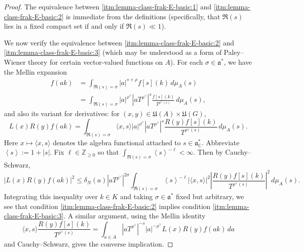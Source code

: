 \documentclass[reqno]{amsart}
\theoremstyle{plain} \newtheorem{theorem} {Theorem}
\theoremstyle{definition} \newtheorem{definition} [theorem] {Definition}
\theoremstyle{itplain} %
\numberwithin{equation}{section}
\numberwithin{theorem}{section}
\renewcommand{\geq}{\geqslant}
\renewcommand{\leq}{\leqslant}
\begin{document}
\begin{proof}
  The equivalence between \eqref{itm:lemma-class-frak-E-basic:1} and \eqref{itm:lemma-class-frak-E-basic:2} is immediate from the definitions (specifically, that $\Re(s)$ lies in a fixed compact set if and only if $\Re(s) \ll 1$).

  We now verify the equivalence between \eqref{itm:lemma-class-frak-E-basic:2} and \eqref{itm:lemma-class-frak-E-basic:3} (which may be understood as a form of Paley--Wiener theory for certain vector-valued functions on $A$).  For each $\sigma \in \mathfrak{a}^*$, we have the Mellin expansion
    \begin{align*}
    f(a k)
    &= \int _{\Re(s) = \sigma } |a|^{s + \rho} f[s](k) \, d \mu_A(s) \\
    &= \int _{\Re(s) = \sigma } |a|^{\rho^\vee} \left\lvert a T ^{\rho ^\vee } \right\rvert^{s} \frac{f[s](k)}{T^{\rho^\vee(s)}} \, d \mu_A(s),
    \end{align*}
  and also its variant for derivatives: for $(x,y) \in \mathfrak{U}(A) \times \mathfrak{U}(G)$,
  \begin{equation*}
    L(x) R(y) f(a k) =
      \int _{\Re(s) = \sigma }
    \langle x, s \rangle
    |a|^{\rho^\vee} \left\lvert a T ^{\rho ^\vee } \right\rvert^{s} \frac{R(y) f[s](k)}{T^{\rho^\vee(s)}} \, d \mu_A(s).
  \end{equation*}
  Here $x \mapsto \langle x, s \rangle$ denotes the algebra functional attached to $s \in \mathfrak{a}_{\mathbb{C}}^*$.  Abbreviate $\left\langle s \right\rangle := 1 + |s|$.  Fix $\ell \in \mathbb{Z}_{\geq 0}$ so that $\int _{\Re(s) = \sigma} \left\langle s \right\rangle^{-\ell} < \infty$.  Then by Cauchy--Schwarz,
  \begin{equation}\label{eq:lx-ry-fa}
    |L(x) R(y) f(a k)|^2 \leq
    \delta_N(a)
    \left\lvert a T ^{\rho ^\vee } \right\rvert^{2 \sigma }
    \int _{\Re(s) = \sigma }
    \left\langle s \right\rangle^{-\ell}
    \left\lvert \langle x, s \rangle \right\rvert^2
    \left\lvert \frac{R(y) f[s](k)}{T^{\rho^\vee(s)}} \right\rvert^2
     \, d \mu_A(s).
   \end{equation}
   Integrating this inequality over $k \in K$ and taking $\sigma \in \mathfrak{a}^*$ fixed but arbitrary, we see that condition \eqref{itm:lemma-class-frak-E-basic:2} implies condition \eqref{itm:lemma-class-frak-E-basic:3}.  A similar argument, using the Mellin identity
  \begin{equation*}
    \langle x,  s \rangle
    \frac{R(y) f[s](k)}{T^{\rho^\vee(s)}}
    =
    \int _{a \in A}
    \left\lvert a T^{\rho^\vee} \right\rvert^{-s}
    |a|^{-\rho^\vee} L(x) R(y) f(a k) \, d a
  \end{equation*}
  and Cauchy--Schwarz, gives the converse implication.
\end{proof}
\end{document}

